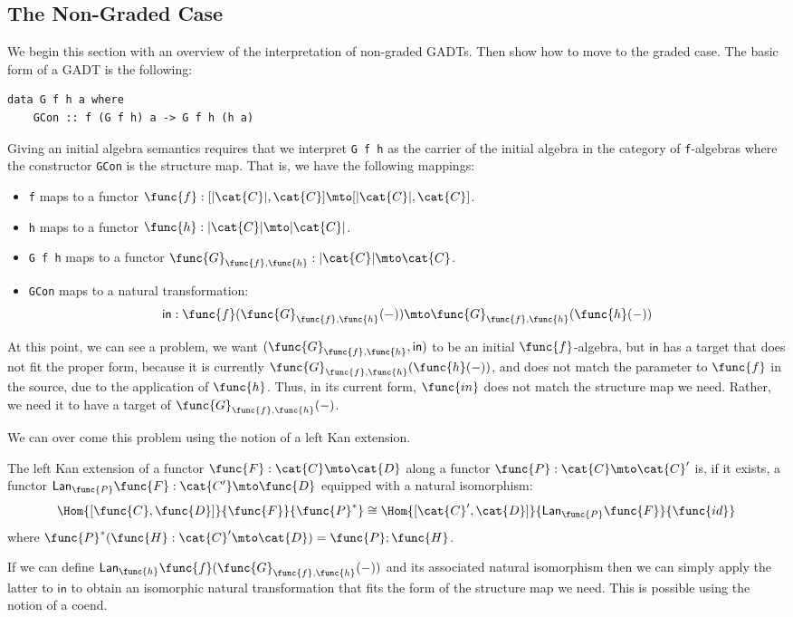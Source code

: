 \subsection{The Non-Graded Case}
\label{subsec:the_non_graded_case}
We begin this section with an overview of the interpretation of
non-graded GADTs.  Then show how to move to the graded case. The basic
form of a GADT is the following:
\begin{verbatim}
data G f h a where
    GCon :: f (G f h) a -> G f h (h a)
\end{verbatim}
Giving an initial algebra semantics requires that we interpret 
\verb!G f h! as the carrier of the initial algebra in the category 
of \verb!f!-algebras where the constructor \verb!GCon! is the 
structure map.  That is, we have the following mappings:
\begin{itemize}
    \item \verb!f! maps to a functor $\func{f} : [|\cat{C}|,\cat{C}]
    \mto [|\cat{C}|, \cat{C}]$.

    \item \verb!h! maps to a functor $\func{h} : |\cat{C}| \mto
    |\cat{C}|$. 

    \item \verb!G f h! maps to a functor 
$\func{G}_{\func{f},\func{h}} : |\cat{C}| \mto \cat{C}$.

    \item \verb!GCon! maps to a natural transformation:
          \[
            \mathsf{in} : \func{f}(\func{G}_{\func{f},\func{h}}(-)) \mto \func{G}_{\func{f},\func{h}}(\func{h}(-))
          \]
\end{itemize}
At this point, we can see a problem, we want $(\func{G}_{\func{f},\func{h}},
\mathsf{in})$ to be an initial $\func{f}$-algebra, but
$\mathsf{in}$ has a target that does not fit the proper form, because
it is currently $\func{G}_{\func{f},\func{h}}(\func{h}(-))$, and
does not match the parameter to $\func{f}$ in the source, due to
the application of $\func{h}$.  Thus, in its current form, $\func{in}$
does not match the structure map we need.  Rather, we need it to have
a target of $\func{G}_{\func{f},\func{h}}(-)$.

We can over come this problem using the notion of a left Kan
extension. 
\newcommand{\Lan}[2]{\mathsf{Lan}_{#1}#2}
\begin{definition}
\label{def:left_kan_extension}
The left Kan extension of a functor $\func{F} : \cat{C} \mto \cat{D}$
along a functor $\func{P} : \cat{C} \mto \cat{C}'$ is, if it exists, a
functor $\Lan{\func{P}}{\func{F}} : \cat{C'} \mto \func{D}$ equipped
with a natural isomorphism:
\[
    \Hom{[\func{C},\func{D}]}{\func{F}}{\func{P}^*} \cong \Hom{[\cat{C}',\cat{D}]}{\Lan{\func{P}}{\func{F}}}{\func{id}}
\]
where $\func{P}^*(\func{H} : \cat{C}' \mto \cat{D}) = \func{P};\func{H}$.
\end{definition}
\noindent
If we can define
$\Lan{\func{h}}{\func{f}(\func{G}_{\func{f},\func{h}}(-))}$ and its
associated natural isomorphism then we can simply apply the latter to
$\mathsf{in}$ to obtain an isomorphic natural transformation that fits
the form of the structure map we need. This is possible using the
notion of a coend.

